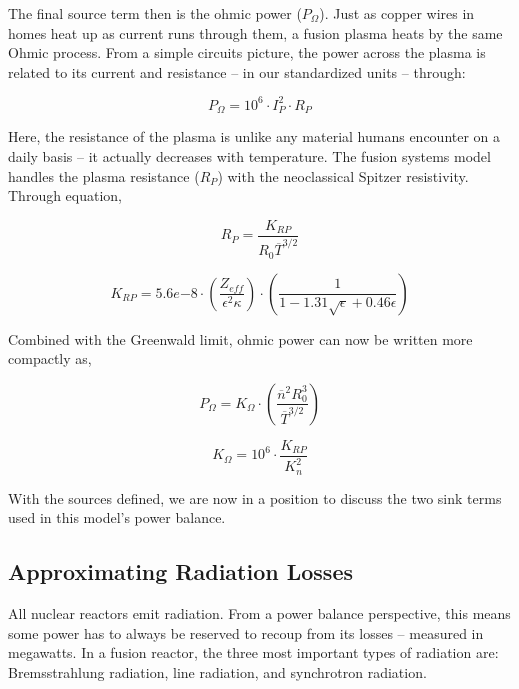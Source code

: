 The final source term then is the ohmic power ($P_\Omega$). Just as copper wires in homes heat up as current runs through them, a fusion plasma heats by the same Ohmic process. From a simple circuits picture, the power across the plasma is related to its current and resistance -- in our standardized units -- through:

\begin{equation}
	\label{eq:pohmic_basic}
	P_\Omega = 10^6 \cdot I_P^2 \cdot R_P
\end{equation}

Here, the resistance of the plasma is unlike any material humans encounter on a daily basis -- it actually decreases with temperature. The fusion systems model handles the plasma resistance ($R_P$)  with the neoclassical Spitzer resistivity. Through equation,

\begin{equation}
	R_P = \frac{K_{RP}}{R_0 \overline T ^ {3/2}}
\end{equation}

\begin{equation}
	K_{RP} = 5.6e{-8} \cdot \left( \frac{ Z_{eff} }{ \epsilon^2 \kappa } \right) \cdot \left( \frac{1}{ 1 - 1.31 \sqrt{ \epsilon } + 0.46 \epsilon } \right)
\end{equation}

Combined with the Greenwald limit, ohmic power can now be written more compactly as,

\begin{equation}
	\label{eq:pohmic}
	P_\Omega = K_\Omega \cdot \left( \frac{ \overline n ^ 2 R_0^3 }{\overline T ^ {3/2}} \right)
\end{equation}

\begin{equation}
	K_\Omega = 10^6 \cdot \frac{K_{RP}}{K_n^2}
\end{equation}

With the sources defined, we are now in a position to discuss the two sink terms used in this model's power balance.

\subsection{Approximating Radiation Losses}

All nuclear reactors emit radiation. From a power balance perspective, this means some power has to always be reserved to recoup from its losses -- measured in megawatts. In a fusion reactor, the three most important types of radiation are: Bremsstrahlung radiation, line radiation, and synchrotron radiation. 

